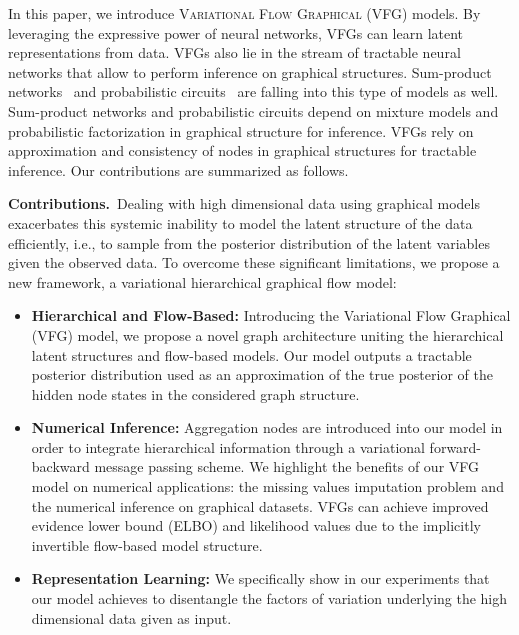 \documentclass[sigconf, anonymous, review]{acmart}
\theoremstyle{plain}
\theoremstyle{definition}
\theoremstyle{remark}
\begin{document}
In this paper, we  introduce \textsc{Variational Flow Graphical (VFG)} models. By leveraging the expressive power of neural networks, VFGs can learn  latent representations from data. 
VFGs also lie in the stream of tractable neural networks that allow to perform inference on graphical structures.  
Sum-product networks~\cite{sanchez2021sum} and probabilistic circuits~\cite{choi2020probabilistic} are falling into this type of models as well. 
Sum-product networks and probabilistic circuits depend on mixture models and probabilistic factorization in graphical structure for inference. VFGs rely on approximation and consistency of  nodes in graphical structures for tractable inference.
Our contributions are summarized as follows. 


\textbf{Contributions.}\ Dealing with high dimensional data using graphical models exacerbates this systemic inability to model the latent structure of the data efficiently, i.e., to sample from the posterior distribution of the latent variables given the observed data.
To overcome these significant limitations, we propose a new framework, a variational hierarchical graphical flow model:
\begin{itemize}
    \item \textbf{Hierarchical and Flow-Based:} Introducing the Variational Flow Graphical (VFG) model, we propose a novel graph architecture uniting the hierarchical latent structures and flow-based models.  Our model outputs a tractable posterior distribution used as an approximation of the true posterior of the hidden node states in the considered graph structure. 
    
    \item \textbf{Numerical Inference:}  Aggregation nodes are introduced into our model in order to integrate hierarchical information through a variational forward-backward message passing scheme.  We highlight the benefits of our VFG model on  numerical applications: the missing values imputation problem and the numerical inference on graphical datasets. VFGs can  achieve improved evidence lower bound (ELBO) and likelihood values due to the implicitly invertible flow-based model structure. 
    
   \item \textbf{Representation Learning:} We specifically show in our experiments that our model achieves to disentangle the factors of variation underlying the high dimensional data given as input.
\end{itemize}
\end{document}
